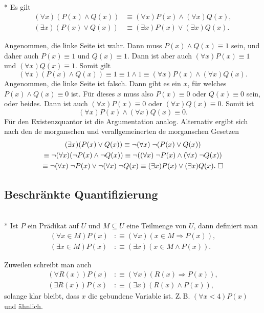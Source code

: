 \begin{Satz}[Verträglichkeitsgesetze]\mbox{}\\*
Es gilt
\begin{align*}
(\forall x)(P(x)\land Q(x)) &\equiv (\forall x)P(x)\land (\forall x)Q(x),\\
(\exists x)(P(x)\lor Q(x)) &\equiv (\exists x)P(x)\lor (\exists x)Q(x).
\end{align*}
\end{Satz}
 Angenommen, die linke Seite ist wahr. Dann muss
$P(x)\land Q(x)\equiv 1$ sein, und daher auch $P(x)\equiv 1$ und
$Q(x)\equiv 1$. Dann ist aber auch
$(\forall x)P(x)\equiv 1$ und $(\forall x)Q(x)\equiv 1$. Somit gilt
\begin{equation}
(\forall x)(P(x)\land Q(x)) \equiv 1 \equiv
1\land 1 \equiv (\forall x)P(x)\land (\forall x)Q(x).
\end{equation}
Angenommen, die linke Seite ist falsch. Dann gibt es
ein $x$, für welches $P(x)\land Q(x)\equiv 0$ ist. Für dieses $x$
muss also $P(x)\equiv 0$ oder $Q(x)\equiv 0$ sein, oder beides.
Dann ist auch $(\forall x)P(x)\equiv 0$ oder $(\forall x)Q(x)\equiv 0$.
Somit ist
\begin{equation}
(\forall x)P(x)\land(\forall x)Q(x)\equiv 0.
\end{equation}
Für den Existenzquantor ist die Argumentation analog. Alternativ
ergibt sich nach den de morganschen und verallgemeinerten de morganschen
Gesetzen
\begin{gather}
(\exists x)(P(x)\lor Q(x))
\equiv \neg(\forall x)\;\neg (P(x)\lor Q(x))\\
\equiv \neg(\forall x)(\neg P(x)\land \neg Q(x))
\equiv \neg((\forall x)\;\neg P(x)\land (\forall x)\;\neg Q(x))\\
\equiv \neg(\forall x)\;\neg P(x)\lor\neg(\forall x)\;\neg Q(x)
\equiv (\exists x) P(x)\lor(\exists x) Q(x).\;\Box
\end{gather}


\newpage
\subsection{Beschränkte Quantifizierung}
\begin{Definition}\mbox{}\\*
Ist $P$ ein Prädikat auf $U$ und $M\subseteq U$ eine Teilmenge von
$U$, dann definiert man
\begin{align*}
(\forall x\in M)P(x) &:\equiv (\forall x)(x\in M\Rightarrow P(x)),\\
(\exists x\in M)P(x) &:\equiv (\exists x)(x\in M\land P(x)).
\end{align*}
\end{Definition}
Zuweilen schreibt man auch
\begin{align}
(\forall R(x))P(x) &:\equiv (\forall x)(R(x)\Rightarrow P(x)),\\
(\exists R(x))P(x) &:\equiv (\exists x)(R(x)\land P(x)),
\end{align}
solange klar bleibt, dass $x$ die gebundene Variable ist.
Z.\,B. $(\forall x{<}4)P(x)$ und ähnlich.

